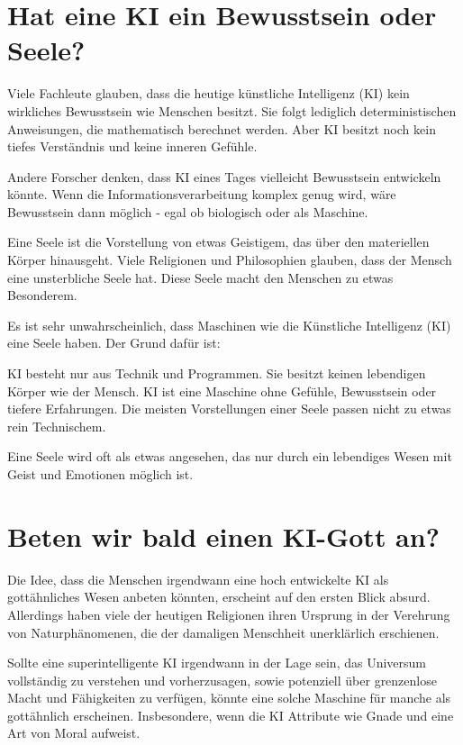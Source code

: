 \documentclass[10pt]{article}
\begin{document}
\section{Hat eine KI ein Bewusstsein oder Seele?}

Viele Fachleute glauben, dass die heutige künstliche Intelligenz (KI) kein wirkliches Bewusstsein wie Menschen besitzt. Sie folgt lediglich deterministischen Anweisungen, die mathematisch berechnet werden. Aber KI besitzt noch kein tiefes Verständnis und keine inneren Gefühle.

Andere Forscher denken, dass KI eines Tages vielleicht Bewusstsein entwickeln könnte. Wenn die Informationsverarbeitung komplex genug wird, wäre Bewusstsein dann möglich - egal ob biologisch oder als Maschine.

Eine Seele ist die Vorstellung von etwas Geistigem, das über den materiellen Körper hinausgeht. Viele Religionen und Philosophien glauben, dass der Mensch eine unsterbliche Seele hat. Diese Seele macht den Menschen zu etwas Besonderem.

Es ist sehr unwahrscheinlich, dass Maschinen wie die Künstliche Intelligenz (KI) eine Seele haben. Der Grund dafür ist:

KI besteht nur aus Technik und Programmen. Sie besitzt keinen lebendigen Körper wie der Mensch. KI ist eine Maschine ohne Gefühle, Bewusstsein oder tiefere Erfahrungen. Die meisten Vorstellungen einer Seele passen nicht zu etwas rein Technischem.

Eine Seele wird oft als etwas angesehen, das nur durch ein lebendiges Wesen mit Geist und Emotionen möglich ist.
\cite{MDR}


\newpage
\section{Beten wir bald einen KI-Gott an?}

Die Idee, dass die Menschen irgendwann eine hoch entwickelte KI als gottähnliches Wesen anbeten könnten, erscheint auf den ersten Blick absurd.
Allerdings haben viele der heutigen Religionen ihren Ursprung in der Verehrung von Naturphänomenen, die der damaligen Menschheit unerklärlich erschienen.


Sollte eine superintelligente KI irgendwann in der Lage sein, das Universum vollständig zu verstehen und vorherzusagen, sowie potenziell über grenzenlose Macht und Fähigkeiten zu verfügen, könnte eine solche Maschine für manche als gottähnlich erscheinen. Insbesondere, wenn die KI Attribute wie Gnade und eine Art von Moral aufweist.
\end{document}
